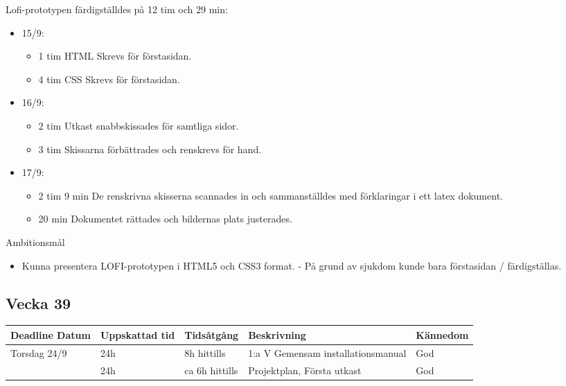 \documentclass{TDP003mall}
\begin{document}
Lofi-prototypen färdigställdes på 12 tim och 29 min:
\begin{itemize}
	\item 15/9:
	\begin{itemize}
		\item 1 tim HTML Skrevs för förstasidan.
		\item 4 tim CSS Skrevs för förstasidan.
        \end{itemize}
	\item 16/9:
	\begin{itemize}
		\item 2 tim Utkast snabbskissades för samtliga sidor.
		\item 3 tim Skissarna förbättrades och renskrevs för hand.
	\end{itemize}
	\item 17/9:
	\begin{itemize}
		\item 2 tim 9 min De renskrivna skisserna scannades in och sammanställdes med förklaringar i ett latex dokument.
		\item 20 min Dokumentet rättades och bildernas plats justerades.\\
	\end{itemize}
\end{itemize}

Ambitionsmål
\begin{itemize}
  \item Kunna presentera LOFI-prototypen i HTML5 och CSS3 format. - På grund av sjukdom kunde bara förstasidan / färdigställas.
  \end{itemize}
  


  
\subsection{Vecka 39}
\begin{tabularx}{\linewidth}{|l|l|l|X|l|}
	\hline
	Deadline Datum & Uppskattad tid & Tidsåtgång     & Beskrivning                        & Kännedom \\ 
	\hline
	Torsdag 24/9   & 24h            & 8h hittills    & 1:a V Gemensam installationsmanual & God      \\
	\hline
                   & 24h            & ca 6h hittills & Projektplan, Första utkast         & God      \\
	\hline
\end{tabularx}
\end{document}
